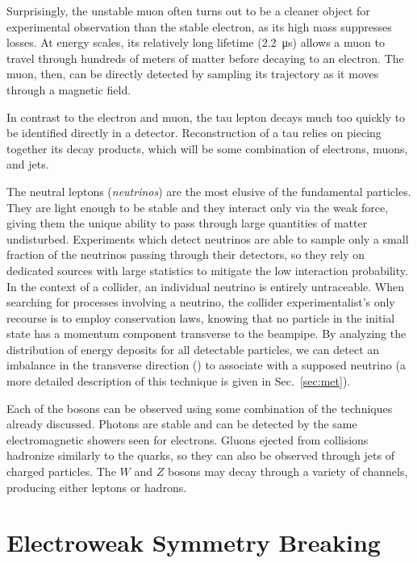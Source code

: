Surprisingly, the unstable muon often turns out to be a cleaner object for experimental observation than the stable electron, as its high mass suppresses \brem losses.  At \GeV energy scales, its relatively long lifetime (\SI{2.2}{\micro s}) allows a muon to travel through hundreds of meters of matter before decaying to an electron.  The muon, then, can be directly detected by sampling its trajectory as it moves through a magnetic field.

In contrast to the electron and muon, the tau lepton decays much too quickly to be identified directly in a detector.  Reconstruction of a tau relies on piecing together its decay products, which will be some combination of electrons, muons, and jets.

The neutral leptons (\emph{neutrinos}) are the most elusive of the fundamental particles.  They are light enough to be stable and they interact only via the weak force, giving them the unique ability to pass through large quantities of matter undisturbed.  Experiments which detect neutrinos are able to sample only a small fraction of the neutrinos passing through their detectors, so they rely on dedicated sources with large statistics to mitigate the low interaction probability.  In the context of a collider, an individual neutrino is entirely untraceable.  When searching for processes involving a neutrino, the collider experimentalist's only recourse is to employ conservation laws, knowing that no particle in the initial state has a momentum component transverse to the beampipe.  By analyzing the distribution of energy deposits for all detectable particles, we can detect an imbalance in the transverse direction (\MET) to associate with a supposed neutrino (a more detailed description of this technique is given in Sec.~\ref{sec:met}).

Each of the bosons can be observed using some combination of the techniques already discussed.  Photons are stable and can be detected by the same electromagnetic showers seen for electrons.  Gluons ejected from collisions hadronize similarly to the quarks, so they can also be observed through jets of charged particles.  The $W$ and $Z$ bosons may decay through a variety of channels, producing either leptons or hadrons.

\section{Electroweak Symmetry Breaking}

